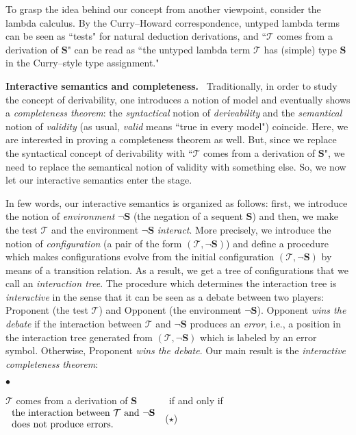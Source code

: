 \documentclass[copyright,creativecommons]{eptcs}
\def\ie{i.e., }
\newcommand{\cT}{\mathcal{T}}
\newcommand{\bS}{\mathbf{S}}
\theoremstyle{definition}
\newcommand{\squishlist}{
 \begin{list}{$\bullet$}
  { \setlength{\itemsep}{0pt}
     \setlength{\parsep}{3pt}
     \setlength{\topsep}{3pt}
     \setlength{\partopsep}{0pt}
     \setlength{\leftmargin}{1em}
     \setlength{\labelwidth}{1.5em}
     \setlength{\labelsep}{0.5em} } }
\newcommand{\squishend}{
  \end{list}  }
\begin{document}
To grasp the idea behind our  concept from another  viewpoint, consider the lambda calculus. By the Curry--Howard correspondence, untyped  lambda terms can be seen as ``tests"
for  natural deduction derivations, and  ``$\cT$ comes from a derivation
of \/$\bS$"
 can be read  as ``the untyped lambda term $\cT$
has (simple) type  $\bS$ in the Curry--style type assignment."\\
\vspace{-0.35cm}








 \noindent \textbf{Interactive semantics and completeness.} \
Traditionally, in order to study   the concept of derivability,   one  introduces a notion of model and eventually shows a \emph{completeness
theorem}:  the \emph{syntactical} notion of \emph{derivability}
and the \emph{semantical} notion  of \emph{validity}
(as usual, \emph{valid} means ``true in every model")
coincide. Here, we are interested in
proving a completeness theorem as well.
But, since we   replace the syntactical concept of derivability
with ``$\cT$ comes from a derivation
of \/$\bS$", we   need to replace the semantical notion  of  validity with something else.
So, we now let our interactive semantics enter the stage.

In few words, our interactive semantics is organized as follows: first, we introduce the notion
of \emph{environment} $\neg \bS$ (the  negation  of a  sequent $\bS$) and then,
we make the test $\cT$ and the environment $\neg \bS$ \emph{interact}.
More precisely, we  introduce the notion of \emph{configuration} (a pair of the form $(\cT,\neg \bS)$) and define a procedure which makes configurations evolve from the initial configuration $(\cT,\neg \bS)$ by means of
a  transition relation. As a result, we get a tree of configurations
that we call an \emph{interaction tree}.
The procedure which determines
the interaction tree is \emph{interactive} in the sense
that it can be seen as a debate
between two players: Proponent  (the test $\cT$)
and   Opponent (the environment $\neg \bS$).
Opponent  \emph{wins the debate} if  the interaction between $\cT$ and $\neg \bS$ produces
 an
\emph{error}, \ie a position
in the interaction tree generated  from  $(\cT,\neg \bS)$ which is labeled by an  error symbol. Otherwise, Proponent \emph{wins the debate}. Our main result is the \emph{interactive completeness theorem}:
\vspace{-0.1cm}
\squishlist
\item[] {\centering
$\cT$ comes from a derivation  of $\bS$ \ \ \ \ \ \ if and only if \ \ \ \ \ \ $\left.
  \begin{array}{l}
  \hbox{the interaction between $\cT$ and $\neg \bS$} \\
  \hbox{does not
produce errors.}   \end{array}
\right.$ \hfill ($\star$) \par}
\squishend
\end{document}
